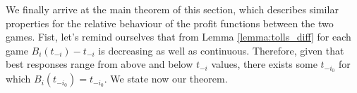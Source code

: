 \documentclass[10pt,a4paper]{book}
\newcommand{\Gm}{\mathcal{G}}
\theoremstyle{definition}
\newtheorem{lemma}[definition]{Lemma}
\newtheorem{corollary}[definition]{Corollary}
\theoremstyle{comment}
\begin{document}
%

We finally arrive at the main theorem of this section, which describes similar properties for the relative behaviour of the profit functions between the two games.
Fist, let's remind ourselves that from Lemma \ref{lemma:tolls_diff} for each game $B_i(t_{-i}) - t_{-i}$ is decreasing as well as continuous.
Therefore, given that best responses range from above and below $t_{-i}$ values, there exists some $t_{-i_0}$ for which $B_i(t_{-i_0}) = t_{-i_0}$.
We state now our theorem.
\end{document}
